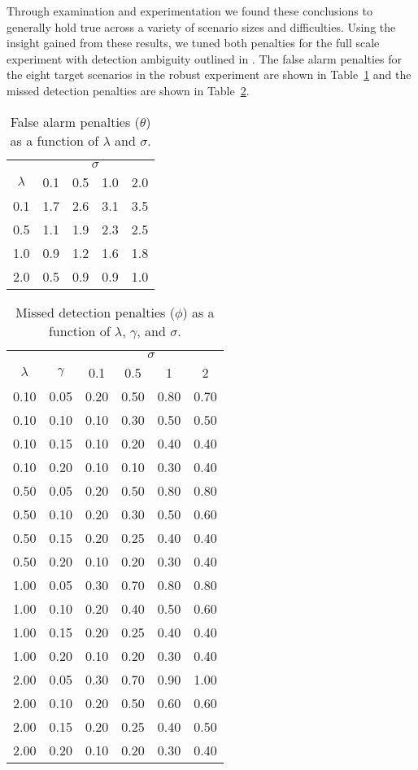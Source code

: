Through examination and experimentation we found these conclusions to generally hold true across a variety of scenario sizes and difficulties. Using the insight gained from these results, we tuned both penalties for the full scale experiment with detection ambiguity outlined in . The false alarm penalties for the eight target scenarios in the robust experiment are shown in Table~\ref{tab:Theta_Penalties} and the missed detection penalties are shown in Table~\ref{tab:Phi_Penalties}.
\begin{table}[ht]
\centering
\begin{tabular}{c|m{1cm}m{1cm}m{1cm}m{1cm}}
  \hline
   & \multicolumn{4}{c}{$\sigma$} \\
   \cline{2-5}
   $\lambda$ & 0.1 & 0.5 & 1.0 & 2.0\\
  \hline
  \hline
   0.1 & 1.7 & 2.6 & 3.1 & 3.5 \\
   0.5 & 1.1 & 1.9 & 2.3 & 2.5 \\ 
   1.0 & 0.9 & 1.2 & 1.6 & 1.8 \\ 
   2.0 & 0.5 & 0.9 & 0.9 & 1.0 \\ 
   \hline
\end{tabular}
\caption{False alarm penalties ($\theta$) as a function of $\lambda$ and $\sigma$.}
\label{tab:Theta_Penalties}
\end{table}
\begin{table}[ht]
\centering
\begin{tabular}{cc|cccc}
  \hline
  & & \multicolumn{4}{c}{$\sigma$} \\
  \cline{3-6}
 $\lambda$ & $\gamma$ & 0.1 & 0.5 & 1 & 2 \\ 
  \hline
  \hline
   0.10 & 0.05 & 0.20 & 0.50 & 0.80 & 0.70 \\ 
   0.10 & 0.10 & 0.10 & 0.30 & 0.50 & 0.50 \\ 
   0.10 & 0.15 & 0.10 & 0.20 & 0.40 & 0.40 \\ 
   0.10 & 0.20 & 0.10 & 0.10 & 0.30 & 0.40 \\ 
   0.50 & 0.05 & 0.20 & 0.50 & 0.80 & 0.80 \\ 
   0.50 & 0.10 & 0.20 & 0.30 & 0.50 & 0.60 \\ 
   0.50 & 0.15 & 0.20 & 0.25 & 0.40 & 0.40 \\ 
   0.50 & 0.20 & 0.10 & 0.20 & 0.30 & 0.40 \\ 
   1.00 & 0.05 & 0.30 & 0.70 & 0.80 & 0.80 \\ 
   1.00 & 0.10 & 0.20 & 0.40 & 0.50 & 0.60 \\ 
   1.00 & 0.15 & 0.20 & 0.25 & 0.40 & 0.40 \\ 
   1.00 & 0.20 & 0.10 & 0.20 & 0.30 & 0.40 \\ 
   2.00 & 0.05 & 0.30 & 0.70 & 0.90 & 1.00 \\ 
   2.00 & 0.10 & 0.20 & 0.50 & 0.60 & 0.60 \\ 
   2.00 & 0.15 & 0.20 & 0.25 & 0.40 & 0.50 \\ 
   2.00 & 0.20 & 0.10 & 0.20 & 0.30 & 0.40 \\ 
   \hline
\end{tabular}
\caption{Missed detection penalties ($\phi$) as a function of $\lambda$, $\gamma$, and $\sigma$.}
\label{tab:Phi_Penalties}
\end{table}